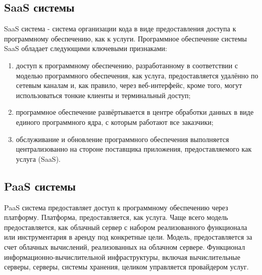 \subsection{SaaS системы}\label{sec:ch2/sec1/sub4} 

SaaS система - система организации кода в виде предоставления доступа к программному обеспечению, как к услуги. 
Программное обеспечение системы SaaS обладает следующими ключевыми признаками:
\begin{enumerate}
    \item доступ к программному обеспечению, разработанному в соответствии с моделью программного обеспечения, как услуга, предоставляется удалённо по сетевым каналам и, как правило, через веб-интерфейс, кроме того, могут использоваться тонкие клиенты и терминальный доступ;
    \item программное обеспечение развёртывается в центре обработки данных в виде единого программного ядра, с которым работают все заказчики;
    \item обслуживание и обновление программного обеспечения выполняется централизованно на стороне поставщика приложения, предоставляемого как услуга (SaaS).
\end{enumerate}

\subsection{PaaS системы}\label{sec:ch2/sec1/sub5}
PaaS система предоставляет доступ к программному обеспечению через платформу. Платформа, предоставляется, как услуга. Чаще всего модель предоставляется, как облачный сервер с набором реализованного функционала или инструментария в аренду под конкретные цели. Модель, предоставляется за счет облачных вычислений, реализованных на облачном сервере. Функционал информационно-вычислительной инфраструктуры, включая вычислительные серверы, серверы, системы хранения, целиком управляется провайдером услуг. 


